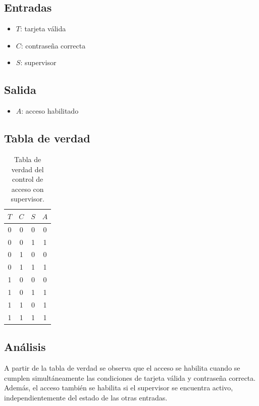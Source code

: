\documentclass[a4paper,12pt]{article}
\begin{document}
\subsection{Entradas}

\begin{itemize}
	\item $T$: tarjeta válida
	\item $C$: contraseña correcta
	\item $S$: supervisor
\end{itemize}

\subsection{Salida}

\begin{itemize}
	\item $A$: acceso habilitado
\end{itemize}

\subsection{Tabla de verdad}

\begin{table}[h]
	\centering
	\begin{tabular}{|c|c|c|c|}
		\hline
		$T$ & $C$ & $S$ & $A$ \\ \hline
		0 & 0 & 0 & 0 \\ \hline
		0 & 0 & 1 & 1 \\ \hline
		0 & 1 & 0 & 0 \\ \hline
		0 & 1 & 1 & 1 \\ \hline
		1 & 0 & 0 & 0 \\ \hline
		1 & 0 & 1 & 1 \\ \hline
		1 & 1 & 0 & 1 \\ \hline
		1 & 1 & 1 & 1 \\ \hline
	\end{tabular}
	\caption{Tabla de verdad del control de acceso con supervisor.}
	\label{tab:ej6_acceso_supervisor}
\end{table}

\subsection{Análisis}

A partir de la tabla de verdad se observa que el acceso se habilita cuando se cumplen simultáneamente las condiciones de tarjeta válida y contraseña correcta. Además, el acceso también se habilita si el supervisor se encuentra activo, independientemente del estado de las otras entradas.
\end{document}
